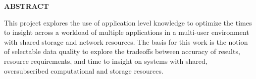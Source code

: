 \vspace{-\belowdisplayskip}
\vspace{-\abovedisplayskip}
\medskip

\begin{center}
\textbf{ABSTRACT}
\end{center}

\vspace{-\belowdisplayskip}

\enlargethispage{2\baselineskip}



This project explores the use of application level knowledge to optimize the
times to insight across a workload of multiple applications in a multi-user
environment with shared storage and network resources. The basis for this
work is the notion of selectable data quality to explore the tradeoffs
between accuracy of results, resource requirements, and time to insight on
systems with shared, oversubscribed computational and storage resources. 

